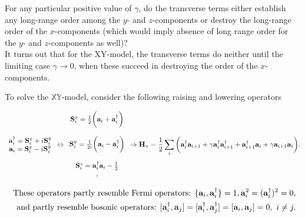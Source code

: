 \documentclass{homework}
\begin{document}
\begin{tcolorbox}
For any particular positive value of $\gamma$, do the transverse terms either establish any long-range order among the $y$- and $z$-components or destroy the long-range order of the $x$-components (which would imply absence of long range order for the $y$- and $z$-components as well)? \\

It turns out that for the XY-model, the transverse terms do neither until the limiting case $\gamma \rightarrow 0$, when these succeed in destroying the order of the $x$-components. 
\end{tcolorbox}

To solve the $\mathds{X}\mathds{Y}$-model, consider the following raising and lowering operators 

\begin{equation} \begin{array}{cc}
     {\bf a}_i^\dagger = {\bf S}_i^x + i {\bf S}_i^y \\ 
     {\bf a}_i = {\bf S}_{i}^x - i {\bf S}_i^y
\end{array} \Leftrightarrow
\begin{array}{c}
     {\bf S}_i^x = \frac{1}{2} \bigg({\bf a}_i+{\bf a}_i^\dagger \bigg)\\
     \\
     {\bf S}_i^y = \frac{1}{2i} \bigg({\bf a}_i-{\bf a}_i^\dagger\bigg)\\
     \\
     {\bf S}_i^z = {\bf a}_i^\dagger {\bf a}_i - \frac{1}{2} \\,
\end{array} \Rightarrow {\bf H}_{\gamma} = \frac{1}{2} \sum_{i} \bigg({\bf a}_i^\dagger {\bf a}_{i+1} + \gamma {\bf a}_i^\dagger {\bf a}_{i+1}^\dagger + {\bf a}_{i+1}^\dagger {\bf a}_i + \gamma {\bf a}_{i+1} {\bf a}_{i}  \bigg).
\label{XY-Hamiltonian_new_form}
\end{equation}

\begin{equation*}
    \begin{split}
    \textnormal{ These operators partly resemble Fermi operators: } \{{\bf a}_i, {\bf a}_i^\dagger\} = 1, {\bf a}_i^2 = ({\bf a}_i^\dagger)^2 = 0, \\
    \textnormal{ and partly resemble bosonic operators: } [{\bf a}_i^\dagger, {\bf a}_j] = [{\bf a}_i^\dagger, {\bf a}_j^\dagger] = [{\bf a}_i, {\bf a}_j] = 0, \textnormal{ } i \neq j.
\end{split}
\end{equation*}
\end{document}
